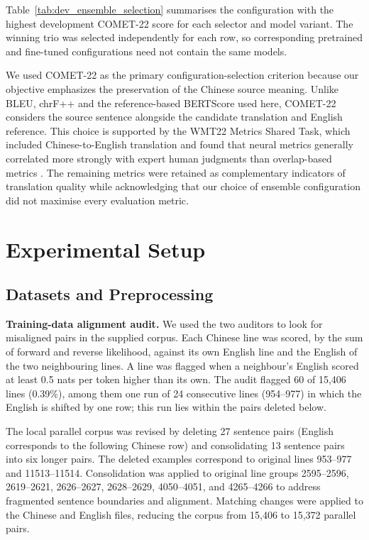 \documentclass[11pt]{article}
\begin{document}
Table~\ref{tab:dev_ensemble_selection} summarises the configuration with the highest development COMET-22 score for each selector and model variant. The winning trio was selected independently for each row, so corresponding pretrained and fine-tuned configurations need not contain the same models.

We used COMET-22 as the primary configuration-selection criterion because our objective emphasizes the preservation of the Chinese source meaning. Unlike BLEU, chrF++ and the reference-based BERTScore used here, COMET-22 considers the source sentence alongside the candidate translation and English reference. This choice is supported by the WMT22 Metrics Shared Task, which included Chinese-to-English translation and found that neural metrics generally correlated more strongly with expert human judgments than overlap-based metrics \citep{freitag-etal-2022-results}. The remaining metrics were retained as complementary indicators of translation quality while acknowledging that our choice of ensemble configuration did not maximise every evaluation metric.

\section{Experimental Setup}
\label{sec:experimental_setup}

\subsection{Datasets and Preprocessing}
\label{subsec:datasets}
\textbf{Training-data alignment audit.} We used the two auditors to look for misaligned pairs in the supplied corpus. Each Chinese line was scored, by the sum of forward and reverse likelihood, against its own English line and the English of the two neighbouring lines. A line was flagged when a neighbour's English scored at least 0.5 nats per token higher than its own. The audit flagged 60 of 15,406 lines (0.39\%), among them one run of 24 consecutive lines (954--977) in which the English is shifted by one row; this run lies within the pairs deleted below.

The local parallel corpus was revised by deleting 27 sentence pairs (English corresponds to the following Chinese row) and consolidating 13 sentence pairs into six longer pairs. The deleted examples correspond to original lines 953–977 and 11513–11514. Consolidation was applied to original line groups 2595–2596, 2619–2621, 2626–2627, 2628–2629, 4050–4051, and 4265–4266 to address fragmented sentence boundaries and alignment. Matching changes were applied to the Chinese and English files, reducing the corpus from 15,406 to 15,372 parallel pairs.
\end{document}
